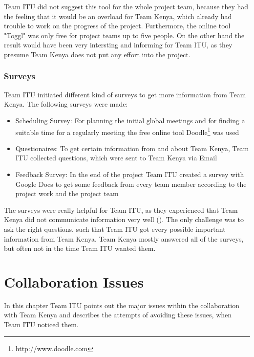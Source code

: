 Team ITU did not suggest this tool for the whole project team, because they had the feeling that it would be an overload for Team Kenya, which already had trouble to work on the progress of the project. Furthermore, the online tool "Toggl" was only free for project teams up to five people. On the other hand the result would have been very intersting and informing for Team ITU, as they presume Team Kenya does not put any effort into the project.

\subsubsection {Surveys}
Team ITU initiated different kind of surveys to get more information from Team Kenya. The following surveys were made:
	\begin{itemize}
		\item Scheduling Survey: For planning the initial global meetings and for finding a suitable time for a regularly meeting the free online tool Doodle\footnote{http://www.doodle.com} was used
		\item Questionaires: To get certain information from and about Team Kenya, Team ITU collected questions, which were sent to Team Kenya via Email 
		\item Feedback Survey: In the end of the project Team ITU created a survey with Google Docs to get some feedback from every team member according to the project work and the project team
	\end{itemize}
The surveys were really helpful for Team ITU, as they experienced that Team Kenya did not communicate information very well (). The only challenge was to ask the right questions, such that Team ITU got every possible important information from Team Kenya. Team Kenya mostly answered all of the surveys, but often not in the time Team ITU wanted them.



\section{Collaboration Issues}
In this chapter Team ITU points out the major issues within the collaboration with Team Kenya and describes the attempts of avoiding these issues, when Team ITU noticed them.


